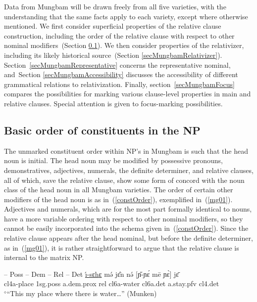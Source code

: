 \documentclass[10pt,twoside]{article}
\makeatletter
\newcommand{\cl}[1]{{\sc cl#1}}
\newcommand{\sref}[1]{Section \ref{#1}}
\def\elicited{$^\diamond$}
\def\HM#1{#1\symbol{"1DC7}}
\renewcommand{\i}{ı}
\def\@{ə}
\def\eh{ɛ}
\def\ny{ɲ}
\makeatother
\begin{document}
Data from Mungbam will be drawn freely from all five
varieties, with the understanding that the same facts apply
to each variety, except where otherwise mentioned.
We first consider superficial properties of the relative
clause construction, including the order of the relative
clause with respect to other nominal modifiers~(\sref{secMungbamOrder}).
We then consider properties of the relativizer, including its likely
historical source~(\sref{secMungbamRelativizer}).
Section~\ref{secMungbamRepresentative} concerns the
representative nominal, and~\sref{secMungbamAccessibility}
discusses the accessibility of different grammatical
relations to relativization.
Finally,
section~\ref{secMungbamFocus} compares the possibilities
for marking various clause-level properties in
main and relative clauses. Special attention is given
to focus-marking possibilities.
%
\subsection{Basic order of constituents in the NP}\label{secMungbamOrder}
%
The unmarked constituent order within NP's in Mungbam is such that
the head noun is initial. The head noun may be modified by
possessive pronouns, demonstratives, adjectives, numerals, the
definite determiner, and relative clauses, all of which,
save the relative clause,
show some form of concord with the noun class of the head noun
in all Mungbam varieties.\footnotemark\/
%
%
The order of certain other modifiers of
the head noun is as in~(\ref{constOrder}), exemplified in~(\ref{mg01}).
Adjectives and numerals, which are for the most part formally
identical to nouns, have a more variable ordering with respect
to other nominal modifiers, so they cannot be easily incorporated
into the schema given in~(\ref{constOrder}).
Since the relative clause appears after the head nominal, but
before the definite determiner,
as in~(\ref{mg01}), it is rather straightforward to argue that
the relative clause is internal to the matrix NP.
%
\begin{exe}
 -- {\sc Poss} -- {\sc Dem} -- {\sc Rel} -- {\sc Det}	\label{constOrder}	%
\ex \gll \uline{\'\i-s\HM{\eh}h{\eh}} m\'{\@} j\^{\eh}n n\'{\@} $[$\H{\ny}-\ny\'{\eh} m\={e} \ny\`{\eh}$]$ j\={\eh}	\\
\cl4a-place {\sc 1sg.poss} {\sc \cl4}a.{\sc dem.prox} {\sc rel} \cl6a-water \cl6a.{\sc det} a.stay.{\sc pfv} {\sc cl4.det}		\\
\glt \elicited``This my place where there is water\dots'' (Munken)\footnotemark\label{mg01} %
\end{exe}
\end{document}
